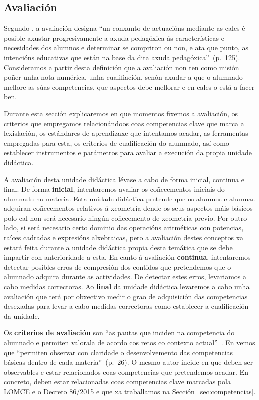 \subsection{Avaliación}\label{sec:avaliacion}

Segundo , a avaliación designa ``un conxunto de actuacións mediante as cales é posible axustar progresivamente a axuda pedagóxica ás características e necesidades dos alumnos e determinar se compriron ou non, e ata que punto, as intencións educativas que están na base da dita axuda pedagóxica''~(p.~125). Consideramos a partir desta definición que a avaliación non ten como misión poñer unha nota numérica, unha cualifiación, senón axudar a que o alumnado mellore as súas competencias, que aspectos debe mellorar e en cales o está a facer ben.

Durante esta sección explicaremos en que momentos fixemos a avaliación, os criterios que empregamos relacionándoos coas competencias clave que marca a lexislación, os estándares de aprendizaxe que intentamos acadar, as ferramentas empregadas para esta, os criterios de cualificación do alumnado, así como establecer instrumentos e parámetros para avaliar a execución da propia unidade didáctica.

A avaliación desta unidade didáctica lévase a cabo de forma inicial, continua e final. De forma \textbf{inicial}, intentaremos avaliar os coñecementos iniciais do alumnado na materia. Esta unidade didáctica pretende que os alumnos e alumnas adquiran coñecementos relativos á xeometría dende os seus aspectos máis básicos polo cal non será necesario ningún coñecemento de xeometría previo. Por outro lado, si será necesario certo dominio das operacións aritméticas con potencias, raíces cadradas e expresións alxebraicas, pero a avaliación destes conceptos xa estará feita durante a unidade didáctica propia desta temática que se debe impartir con anterioridade a esta. En canto á avaliación \textbf{continua}, intentaremos detectar posibles erros de compresión dos contidos que pretendemos que o alumnado adquira durante as actividades. De detectar estes erros, levariamos a cabo medidas correctoras. Ao \textbf{final} da unidade didáctica levaremos a cabo unha avaliación que terá por obxectivo medir o grao de adquisición das competencias desexadas para levar a cabo medidas correctoras como establecer a cualificación da unidade.

Os \textbf{criterios de avaliación} son ``as pautas que inciden na competencia do alumnado e permiten valorala de acordo cos retos co contexto actual''~\cite[p. 134]{secdidac}. En  vemos que ``permiten observar con claridade o desenvolvemento das competencias básicas     dentro de cada materia''~(p.~26). O mesmo autor incide en que deben ser observables e estar relacionados coas competencias que pretendemos acadar. En concreto, deben estar relacionadas coas competencias clave marcadas pola LOMCE e o Decreto 86/2015 e que xa traballamos na Sección~\ref{sec:competencias}.

